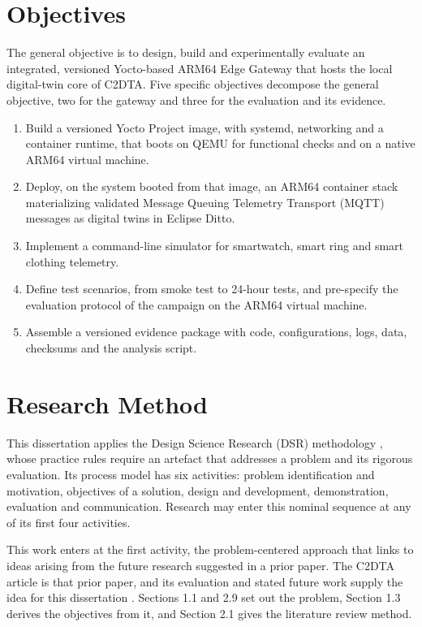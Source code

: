 \section{Objectives}\label{objectives}

\noindent The general objective is to design, build and experimentally evaluate an integrated, versioned Yocto-based ARM64 Edge Gateway that hosts the local digital-twin core of C2DTA. Five specific objectives decompose the general objective, two for the gateway and three for the evaluation and its evidence.

\begin{enumerate}
\def\labelenumi{\arabic{enumi}.}
\item
  Build a versioned Yocto Project image, with systemd, networking and a container runtime, that boots on QEMU for functional checks and on a native ARM64 virtual machine.
\item
  Deploy, on the system booted from that image, an ARM64 container stack materializing validated Message Queuing Telemetry Transport (MQTT) messages as digital twins in Eclipse Ditto.
\item
  Implement a command-line simulator for smartwatch, smart ring and smart clothing telemetry.
\item
  Define test scenarios, from smoke test to 24-hour tests, and pre-specify the evaluation protocol of the campaign on the ARM64 virtual machine.
\item
  Assemble a versioned evidence package with code, configurations, logs, data, checksums and the analysis script.
\end{enumerate}

\section{Research Method}\label{research-method}

\noindent This dissertation applies the Design Science Research (DSR) methodology \cite{word07}, whose practice rules require an artefact that addresses a problem and its rigorous evaluation. Its process model has six activities: problem identification and motivation, objectives of a solution, design and development, demonstration, evaluation and communication\cite{word07}. Research may enter this nominal sequence at any of its first four activities\cite{word07}.

This work enters at the first activity, the problem-centered approach \cite{word07} that links to ideas arising from the future research suggested in a prior paper. The C2DTA article is that prior paper, and its evaluation and stated future work supply the idea for this dissertation \cite{word06}. Sections 1.1 and 2.9 set out the problem, Section 1.3 derives the objectives from it, and Section 2.1 gives the literature review method.

